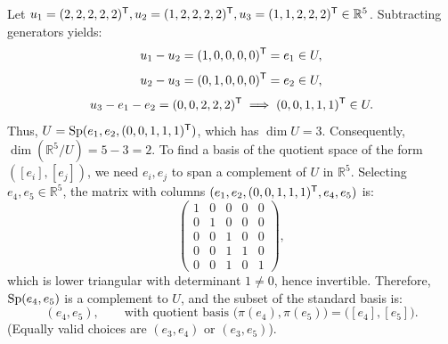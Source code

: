 \begin{exercisesolution*}
\label{sol:basis_of_quotient_space_r5}
Let $u_1 = (2, 2, 2, 2, 2)^{\mathsf{T}}, u_2 = (1, 2, 2, 2, 2)^{\mathsf{T}}, u_3 = (1, 1, 2, 2, 2)^{\mathsf{T}} \in \mathbb{R}^5$.
Subtracting generators yields:
\[
u_1 - u_2 = (1, 0, 0, 0, 0)^{\mathsf{T}} = e_1 \in U,
\]
\[
u_2 - u_3 = (0, 1, 0, 0, 0)^{\mathsf{T}} = e_2 \in U,
\]
\[
u_3 - e_1 - e_2 = (0, 0, 2, 2, 2)^{\mathsf{T}} \implies (0, 0, 1, 1, 1)^{\mathsf{T}} \in U.
\]
Thus, $U = \operatorname{Sp}(e_1, e_2, (0, 0, 1, 1, 1)^{\mathsf{T}})$, which has $\dim U = 3$.
Consequently, $\dim(\mathbb{R}^5/U) = 5 - 3 = 2$.
To find a basis of the quotient space of the form $([e_i], [e_j])$, we need $e_i, e_j$ to span a complement of $U$ in $\mathbb{R}^5$.
Selecting $e_4, e_5 \in \mathbb{R}^5$, the matrix with columns $(e_1, e_2, (0,0,1,1,1)^{\mathsf{T}}, e_4, e_5)$ is:
\[
\begin{pmatrix}
1 & 0 & 0 & 0 & 0 \\
0 & 1 & 0 & 0 & 0 \\
0 & 0 & 1 & 0 & 0 \\
0 & 0 & 1 & 1 & 0 \\
0 & 0 & 1 & 0 & 1
\end{pmatrix},
\]
which is lower triangular with determinant $1 \ne 0$, hence invertible.
Therefore, $\operatorname{Sp}(e_4, e_5)$ is a complement to $U$, and the subset of the standard basis is:
\[
(e_4, e_5), \qquad \text{with quotient basis } \big(\pi(e_4), \pi(e_5)\big) = \big([e_4], [e_5]\big).
\]
(Equally valid choices are $(e_3, e_4)$ or $(e_3, e_5)$).
\end{exercisesolution*}
